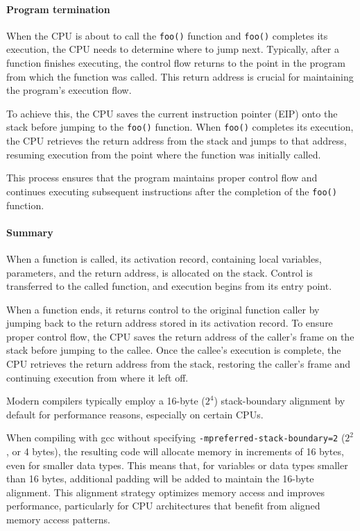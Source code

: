 \paragraph*{Program termination}
When the CPU is about to call the \texttt{foo()} function and \texttt{foo()} completes its execution, the CPU needs to determine where to jump next. 
Typically, after a function finishes executing, the control flow returns to the point in the program from which the function was called. 
This return address is crucial for maintaining the program's execution flow.

To achieve this, the CPU saves the current instruction pointer (EIP) onto the stack before jumping to the \texttt{foo()} function. 
When \texttt{foo()} completes its execution, the CPU retrieves the return address from the stack and jumps to that address, resuming execution from the point where the function was initially called.

This process ensures that the program maintains proper control flow and continues executing subsequent instructions after the completion of the \texttt{foo()} function.

\paragraph*{Summary}
When a function is called, its activation record, containing local variables, parameters, and the return address, is allocated on the stack. 
Control is transferred to the called function, and execution begins from its entry point.

When a function ends, it returns control to the original function caller by jumping back to the return address stored in its activation record. 
To ensure proper control flow, the CPU saves the return address of the caller's frame on the stack before jumping to the callee. 
Once the callee's execution is complete, the CPU retrieves the return address from the stack, restoring the caller's frame and continuing execution from where it left off.

Modern compilers typically employ a 16-byte ($2^4$) stack-boundary alignment by default for performance reasons, especially on certain CPUs.

When compiling with gcc without specifying \texttt{-mpreferred-stack-boundary=2} ($2^2$, or 4 bytes), the resulting code will allocate memory in increments of 16 bytes, even for smaller data types.
This means that, for variables or data types smaller than 16 bytes, additional padding will be added to maintain the 16-byte alignment.
This alignment strategy optimizes memory access and improves performance, particularly for CPU architectures that benefit from aligned memory access patterns.

